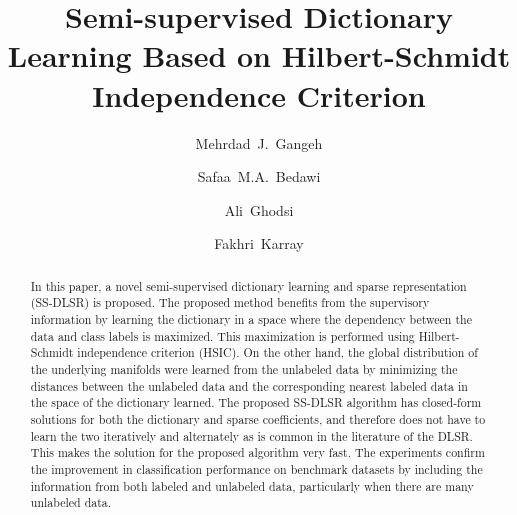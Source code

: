\documentclass{llncs}
\begin{document}
\title{Semi-supervised Dictionary Learning Based on Hilbert-Schmidt Independence Criterion}
\author{Mehrdad~J.~Gangeh \and Safaa~M.A.~Bedawi \and Ali~Ghodsi
\and Fakhri~Karray}


\maketitle              %

\begin{abstract}
In this paper, a novel semi-supervised dictionary learning and sparse representation (SS-DLSR) is proposed. The proposed method benefits from the supervisory information by learning the dictionary in a space where the dependency between the data and class labels is maximized. This maximization is performed using Hilbert-Schmidt independence criterion (HSIC). On the other hand, the global distribution of the underlying manifolds were learned from the unlabeled data by minimizing the distances between the unlabeled data and the corresponding nearest labeled data in the space of the dictionary learned. The proposed SS-DLSR algorithm has closed-form solutions for both the dictionary and sparse coefficients, and therefore does not have to learn the two  iteratively and alternately as is common in the literature of the DLSR. This makes the solution for the proposed algorithm very fast. The experiments confirm the improvement in classification performance on benchmark datasets by including the information from both labeled and unlabeled data, particularly when there are many unlabeled data.
\end{abstract}
\end{document}
